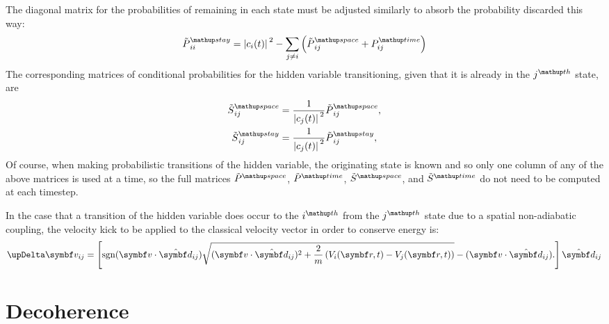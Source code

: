 The diagonal matrix for the probabilities of remaining in each state must be adjusted similarly to absorb the probability discarded this way:
\begin{align}
\tilde P^\up{stay}_{ii} = 
\abs{c_i(t)}^2 - \sum_{j\neq i}\left(\tilde P^\up{space}_{ij} + P^\up{time}_{ij}\right)
\end{align}
The corresponding matrices of conditional probabilities for the hidden variable transitioning, given that it is already in the $j^\up{th}$ state, are
\begin{align}\label{eq:tilde_S_space}
\tilde S^\up{space}_{ij} &= \frac1{\abs{c_j(t)}^2} \tilde P^\up{space}_{ij},\\
\tilde S^\up{stay}_{ij} &= \frac1{\abs{c_j(t)}^2} \tilde P^\up{stay}_{ij},
\end{align}
Of course, when making probabilistic transitions of the hidden variable, the originating state is known and so only one column of any of the above matrices is used at a time, so the full matrices $\tilde P^\up{space}$, $\tilde P^\up{time}$, $\tilde S^\up{space}$, and $\tilde S^\up{time}$ do not need to be computed at each timestep.

In the case that a transition of the hidden variable does occur to the $i^\up{th}$ from the $j^\up{th}$ state due to a spatial non-adiabatic coupling, the velocity kick to be applied to the classical velocity vector in order to conserve energy is:
\begin{align}\label{eq:velocity_jump}
\upDelta \vec v_{ij} = \left[\sgn(\vec v\cdot \hat{\vec d}_{ij})
\sqrt{(\vec v\cdot \hat{\vec d}_{ij})^2 + \frac2m\left(V_i(\vec r, t) - V_j(\vec r, t)\right)} - (\vec v\cdot \hat{\vec d}_{ij}).
\right]\hat{\vec d}_{ij}
\end{align}   

\section{Decoherence}\label{sec:decoherence}

